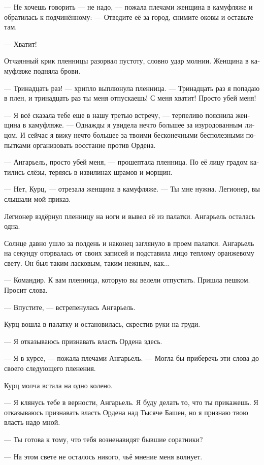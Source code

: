 \documentclass[a4paper,12pt,fleqn]{book}\usepackage{cooltooltips}\usepackage{polyglossia}\setdefaultlanguage[babelshorthands=true]{russian}\setotherlanguage{english}\defaultfontfeatures{Ligatures=TeX,Mapping=tex-text} \usepackage{xcolor}\definecolor{lightgray}{HTML}{bbbbbb}\color{lightgray}\newcommand{\ml}[3]{\textenglish{\textcolor{black}{#3}}}
\begin{document}
--- Не хочешь говорить --- не надо, --- пожала плечами женщина в камуфляже и обратилась к подчинённому:
--- Отведите её за город, снимите оковы и оставьте там.

--- Хватит!

Отчаянный крик пленницы разорвал пустоту, словно удар молнии.
Женщина в камуфляже подняла брови.

--- Тринадцать раз! --- хрипло выплюнула пленница.
--- Тринадцать раз я попадаю в плен, и тринадцать раз ты меня отпускаешь!
С меня хватит!
Просто убей меня!

--- Я всё сказала тебе еще в нашу третью встречу, --- терпеливо пояснила женщина в камуфляже.
--- Однажды я увидела нечто большее за изуродованным лицом.
И сейчас я вижу нечто большее за твоими бесконечными бесполезными попытками организовать восстание против Ордена.

--- Ангарьель, просто убей меня, --- прошептала пленница.
По её лицу градом катились слёзы, теряясь в извилинах шрамов и морщин.

--- Нет, Курц, --- отрезала женщина в камуфляже.
--- Ты мне нужна.
Легионер, вы слышали мой приказ.

Легионер вздёрнул пленницу на ноги и вывел её из палатки.
Ангарьель осталась одна.

Солнце давно ушло за полдень и наконец заглянуло в проем палатки.
Ангарьель на секунду оторвалась от своих записей и подставила лицо теплому оранжевому свету.
Он был таким ласковым, таким нежным, как...

--- Командир.
К вам пленница, которую вы велели отпустить.
Пришла пешком.
Просит слова.

--- Впустите, --- встрепенулась Ангарьель.

Курц вошла в палатку и остановилась, скрестив руки на груди.

--- Я отказываюсь признавать власть Ордена здесь.

--- Я в курсе, --- пожала плечами Ангарьель.
--- Могла бы приберечь эти слова до своего следующего пленения.

Курц молча встала на одно колено.

--- Я клянусь тебе в верности, Ангарьель.
Я буду делать то, что ты прикажешь.
Я отказываюсь признавать власть Ордена над Тысяче Башен, но я признаю твою власть надо мной.

--- Ты готова к тому, что тебя возненавидят бывшие соратники?

--- На этом свете не осталось никого, чьё мнение меня волнует.
\end{document}
